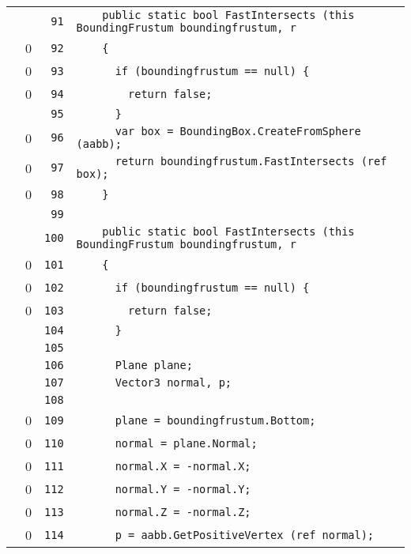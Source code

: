 \documentclass[a4paper,10pt]{article}
\begin{document}
\begin{longtable}[l]{lrrl}
\cellcolor{gray} &  & \verb~91~ & \verb~    public static bool FastIntersects (this BoundingFrustum boundingfrustum, r~\\
\cellcolor{red} & 0 & \verb~92~ & \verb~    {~\\
\cellcolor{red} & 0 & \verb~93~ & \verb~      if (boundingfrustum == null) {~\\
\cellcolor{red} & 0 & \verb~94~ & \verb~        return false;~\\
\cellcolor{gray} &  & \verb~95~ & \verb~      }~\\
\cellcolor{red} & 0 & \verb~96~ & \verb~      var box = BoundingBox.CreateFromSphere (aabb);~\\
\cellcolor{red} & 0 & \verb~97~ & \verb~      return boundingfrustum.FastIntersects (ref box);~\\
\cellcolor{red} & 0 & \verb~98~ & \verb~    }~\\
\cellcolor{gray} &  & \verb~99~ & \verb~~\\
\cellcolor{gray} &  & \verb~100~ & \verb~    public static bool FastIntersects (this BoundingFrustum boundingfrustum, r~\\
\cellcolor{red} & 0 & \verb~101~ & \verb~    {~\\
\cellcolor{red} & 0 & \verb~102~ & \verb~      if (boundingfrustum == null) {~\\
\cellcolor{red} & 0 & \verb~103~ & \verb~        return false;~\\
\cellcolor{gray} &  & \verb~104~ & \verb~      }~\\
\cellcolor{gray} &  & \verb~105~ & \verb~~\\
\cellcolor{gray} &  & \verb~106~ & \verb~      Plane plane;~\\
\cellcolor{gray} &  & \verb~107~ & \verb~      Vector3 normal, p;~\\
\cellcolor{gray} &  & \verb~108~ & \verb~~\\
\cellcolor{red} & 0 & \verb~109~ & \verb~      plane = boundingfrustum.Bottom;~\\
\cellcolor{red} & 0 & \verb~110~ & \verb~      normal = plane.Normal;~\\
\cellcolor{red} & 0 & \verb~111~ & \verb~      normal.X = -normal.X;~\\
\cellcolor{red} & 0 & \verb~112~ & \verb~      normal.Y = -normal.Y;~\\
\cellcolor{red} & 0 & \verb~113~ & \verb~      normal.Z = -normal.Z;~\\
\cellcolor{red} & 0 & \verb~114~ & \verb~      p = aabb.GetPositiveVertex (ref normal);~\\

\end{longtable}
\end{document}
